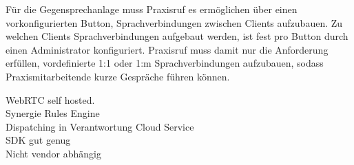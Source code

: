 Für die Gegensprechanlage muss Praxisruf es ermöglichen über einen vorkonfigurierten Button, Sprachverbindungen zwischen Clients aufzubauen.
Zu welchen Clients Sprachverbindungen aufgebaut werden, ist fest pro Button durch einen Administrator konfiguriert.
Praxisruf muss damit nur die Anforderung erfüllen, vordefinierte 1:1 oder 1:m Sprachverbindungen aufzubauen, sodass Praxismitarbeitende kurze Gespräche führen können.

WebRTC self hosted. \\

Synergie Rules Engine \\
Dispatching in Verantwortung Cloud Service \\
SDK gut genug \\
Nicht vendor abhängig \\


\clearpage
